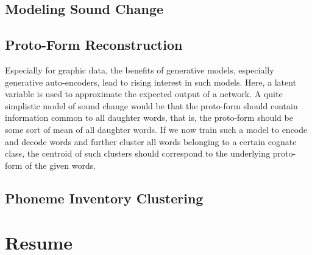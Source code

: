 \documentclass[11pt]{article}
\begin{document}
\subsection{Modeling Sound Change}
\subsection{Proto-Form Reconstruction}
Especially for graphic data, the benefits of generative models, especially generative auto-encoders, lead to rising interest in such models. Here, a latent variable is used to approximate the expected output of a network. A quite simplistic model of sound change would be that the proto-form should contain information common to all daughter words, that is, the proto-form should be some sort of mean of all daughter words. If we now train such a model to encode and decode words and further cluster all words belonging to a certain cognate class, the centroid of such clusters should correspond to the underlying proto-form of the given words.
\subsection{Phoneme Inventory Clustering}
\section{Resume}


 
\end{document}
